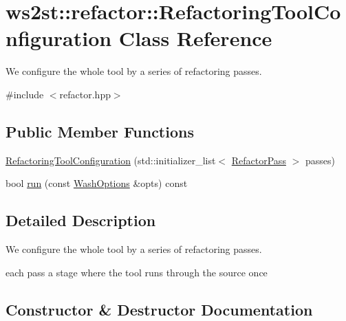 \hypertarget{classws2st_1_1refactor_1_1RefactoringToolConfiguration}{}\section{ws2st\+:\+:refactor\+:\+:Refactoring\+Tool\+Configuration Class Reference}
\label{classws2st_1_1refactor_1_1RefactoringToolConfiguration}


We configure the whole tool by a series of refactoring passes.  




{\ttfamily \#include $<$refactor.\+hpp$>$}

\subsection*{Public Member Functions}
\begin{DoxyCompactItemize}
\item 
\mbox{\hyperlink{classws2st_1_1refactor_1_1RefactoringToolConfiguration_a6170e537d63c130d1224af83a5d0f41f}{Refactoring\+Tool\+Configuration}} (std\+::initializer\+\_\+list$<$ \mbox{\hyperlink{classws2st_1_1refactor_1_1RefactorPass}{Refactor\+Pass}} $>$ passes)
\item 
bool \mbox{\hyperlink{classws2st_1_1refactor_1_1RefactoringToolConfiguration_a7ff018cf2d0f2ec54274efcfa00df72f}{run}} (const \mbox{\hyperlink{structWashOptions}{Wash\+Options}} \&opts) const
\end{DoxyCompactItemize}


\subsection{Detailed Description}
We configure the whole tool by a series of refactoring passes. 


\begin{DoxyItemize}
\item each pass a stage where the tool runs through the source once 
\end{DoxyItemize}

\subsection{Constructor \& Destructor Documentation}
\mbox{\label{classws2st_1_1refactor_1_1RefactoringToolConfiguration_a6170e537d63c130d1224af83a5d0f41f}} 
